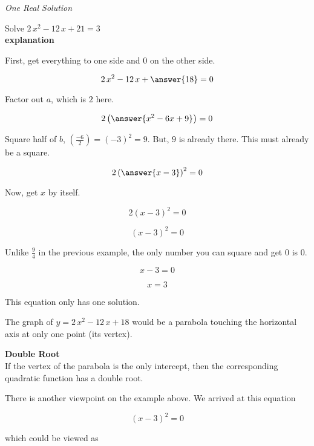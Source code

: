 \documentclass{ximera}
\begin{document}
\begin{example} \textit{One Real Solution}

Solve $2 \, x^2 - 12 \, x + 21 = 3$ \\


\textbf{\textcolor{red!75!green}{explanation}} 


First, get everything to one side and $0$ on the other side.



\[  2 \, x^2 - 12 \, x + \answer{18} = 0  \]

Factor out $a$, which is $2$ here.

\[  2 \left( \answer{x^2 - 6x + 9} \right) = 0  \]


Square half of $b$, $\left(\frac{-6}{2}\right) = (-3)^2 = 9$.  But, $9$ is already there.  This must already be a square.



\[  2 \left( \answer{x - 3} \right)^2 = 0  \]


Now, get $x$ by itself.

\[  2 (x - 3)^2 = 0  \]

\[  (x - 3)^2 = 0  \]


Unlike $\frac{9}{4}$ in the previous example, the only number you can square and get $0$ is $0$.

\[  x - 3 = 0  \]

\[  x = 3  \]


This equation only has one solution.



\end{example}



The graph of $y = 2 \, x^2 - 12\, x + 18$ would be a parabola touching the horizontal axis at only one point (its vertex).




\begin{idea} \textbf{\textcolor{red!80!black}{Double Root}} \\

If the vertex of the parabola is the only intercept, then the corresponding quadratic function has a double root.


\end{idea}



There is another viewpoint on the example above.  We arrived at this equation

\[  (x - 3)^2 = 0  \]

which could be viewed as 
\end{document}

